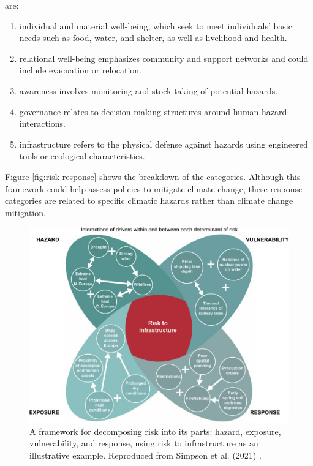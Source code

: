 are: \cite{paterson_community-based_2019}
\begin{enumerate}
    \item individual and material well-being, which seek to meet individuals'
    basic needs such as food, water, and shelter, as well as livelihood and health.
    \item relational well-being emphasizes community and support networks and
    could include evacuation or relocation.
    \item awareness involves monitoring and stock-taking of potential hazards.
    \item governance relates to decision-making structures around human-hazard
    interactions.
    \item infrastructure refers to the physical defense against hazards using
    engineered tools or ecological characteristics.
\end{enumerate} 
Figure \ref{fig:risk-response} shows the breakdown of the categories. Although
this framework could help assess policies to mitigate climate change,
these response categories are related to specific climatic hazards rather than
climate change mitigation.


\begin{figure}
    \centering
    \includegraphics{figures/simpson-risk-framework.jpg}
    \caption{A framework for decomposing risk into its parts: hazard, exposure,
    vulnerability, and response, using risk to infrastructure as an illustrative
    example. Reproduced from Simpson et al. (2021)
    \cite{simpson_framework_2021}.}
    \label{fig:risk-framework}
\end{figure}

